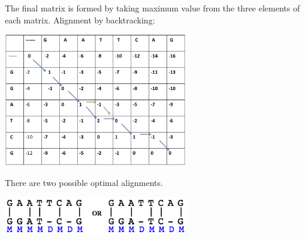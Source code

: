 \documentclass[english, a4paper,11pt]{article}
\begin{document}
The final matrix is formed by taking maximum value from the three elements of each matrix.
\newpage
Alignment by backtracking:
\begin{center}
\includegraphics[width=0.6\textwidth]{Slide4.eps}
\end{center}

There are two possible optimal alignments.

\begin{center}
\includegraphics[width=0.6\textwidth]{alignment2.png}
\end{center}
\end{document}
